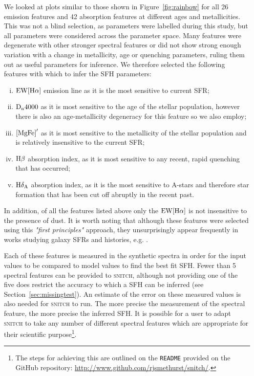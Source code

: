 \documentclass[useAMS,usenatbib]{mn2e}
\begin{document}
We looked at plots similar to those shown in Figure~\ref{fig:rainbow} for all 26 emission features and 42 absorption features at different ages and metallicities. This was not a blind selection, as parameters were labelled during this study, but all parameters were considered across the parameter space. Many features were degenerate with other stronger spectral features or did not show strong enough variation with a change in metallicity, age or quenching parameters, ruling them out as useful parameters for inference. We therefore selected the following features with which to infer the SFH parameters:
\begin{enumerate}[(i)]
\item $\rm{EW}[H\alpha]$ emission line as it is the most sensitive to current SFR;


\item $\rm{D}_n4000$ as it is most sensitive to the age of the stellar population, however there is also an age-metallicity degeneracy for this feature so we also employ;

\item $\rm{[MgFe]}^{\prime}$ as it is most sensitive to the metallicity of the stellar population and is relatively insensitive to the current SFR;

\item $\rm{H}\beta$ absorption index, as it is most sensitive to any recent, rapid quenching that has occurred;

\item $\rm{H}\delta_A$ absorption index, as it is the most sensitive to A-stars and therefore star formation that has been cut off abruptly in the recent past.


\end{enumerate}

In addition, of all the features listed above only the $\rm{EW}[H\alpha]$ is not insensitive to the presence of dust. It is worth noting that although these features were selected using this \emph{"first principles"} approach, they unsurprisingly appear frequently in works studying galaxy SFRs and histories, e.g. \cite{kauffmann03}.

Each of these features is measured in the synthetic spectra in order for the input values to be compared to model values to find the best fit SFH. Fewer than 5 spectral features can be provided to \textsc{snitch}, although not providing one of the five does restrict the accuracy to which a SFH can be inferred (see Section~\ref{sec:missingtest}). An estimate of the error on these measured values is also needed for \textsc{snitch} to run. The more precise the measurement of the spectral feature, the more precise the inferred SFH. It is possible for a user to adapt \textsc{snitch} to take any number of different spectral features which are appropriate for their scientific purpose\footnote{The steps for achieving this are outlined on the \texttt{README} provided on the GitHub repository: \url{http://www.github.com/rjsmethurst/snitch/}.}.
\end{document}
